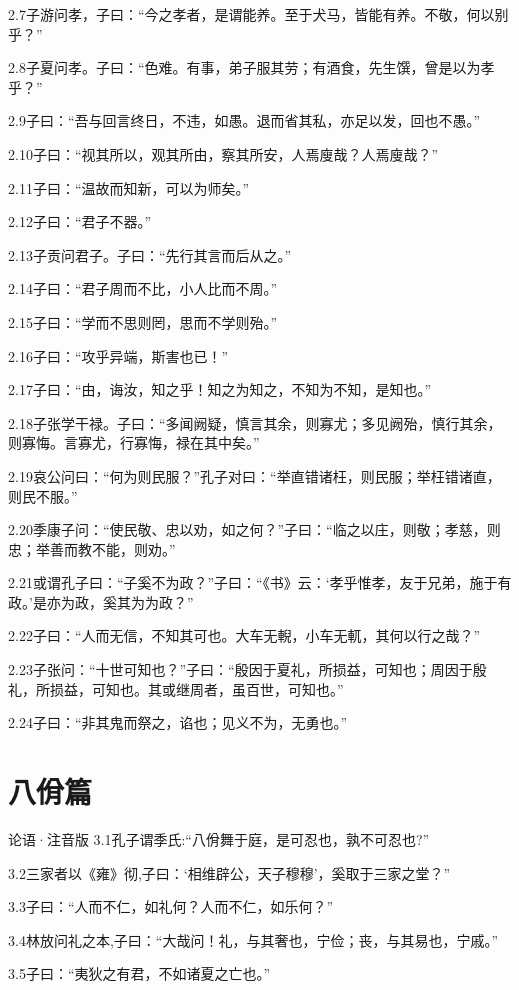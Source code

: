 \documentclass[a4paper,12pt,UTF8,twoside]{ctexbook}
\begin{document}
2.7子游问孝，子曰：“今之孝者，是谓能养。至于犬马，皆能有养。不敬，何以别乎？”


2.8子夏问孝。子曰：“色难。有事，弟子服其劳；有酒食，先生馔，曾是以为孝乎？”

2.9子曰：“吾与回言终日，不违，如愚。退而省其私，亦足以发，回也不愚。”

2.10子曰：“视其所以，观其所由，察其所安，人焉廋哉？人焉廋哉？”

2.11子曰：“温故而知新，可以为师矣。”

2.12子曰：“君子不器。”

2.13子贡问君子。子曰：“先行其言而后从之。”

2.14子曰：“君子周而不比，小人比而不周。”

2.15子曰：“学而不思则罔，思而不学则殆。”

2.16子曰：“攻乎异端，斯害也已！”

2.17子曰：“由，诲汝，知之乎！知之为知之，不知为不知，是知也。”

2.18子张学干禄。子曰：“多闻阙疑，慎言其余，则寡尤；多见阙殆，慎行其余，则寡悔。言寡尤，行寡悔，禄在其中矣。”

2.19哀公问曰：“何为则民服？”孔子对曰：“举直错诸枉，则民服；举枉错诸直，则民不服。”

2.20季康子问：“使民敬、忠以劝，如之何？”子曰：“临之以庄，则敬；孝慈，则忠；举善而教不能，则劝。”

2.21或谓孔子曰：“子奚不为政？”子曰：“《书》云：‘孝乎惟孝，友于兄弟，施于有政。’是亦为政，奚其为为政？”

2.22子曰：“人而无信，不知其可也。大车无輗，小车无軏，其何以行之哉？”

2.23子张问：“十世可知也？”子曰：“殷因于夏礼，所损益，可知也；周因于殷礼，所损益，可知也。其或继周者，虽百世，可知也。”

2.24子曰：“非其鬼而祭之，谄也；见义不为，无勇也。”

\chapter{八佾篇}
论语·注音版
3.1孔子谓季氏:“八佾舞于庭，是可忍也，孰不可忍也?”

3.2三家者以《雍》彻,子曰：‘相维辟公，天子穆穆’，奚取于三家之堂？”

3.3子曰：“人而不仁，如礼何？人而不仁，如乐何？”

3.4林放问礼之本,子曰：“大哉问！礼，与其奢也，宁俭；丧，与其易也，宁戚。”

3.5子曰：“夷狄之有君，不如诸夏之亡也。”
\end{document}
